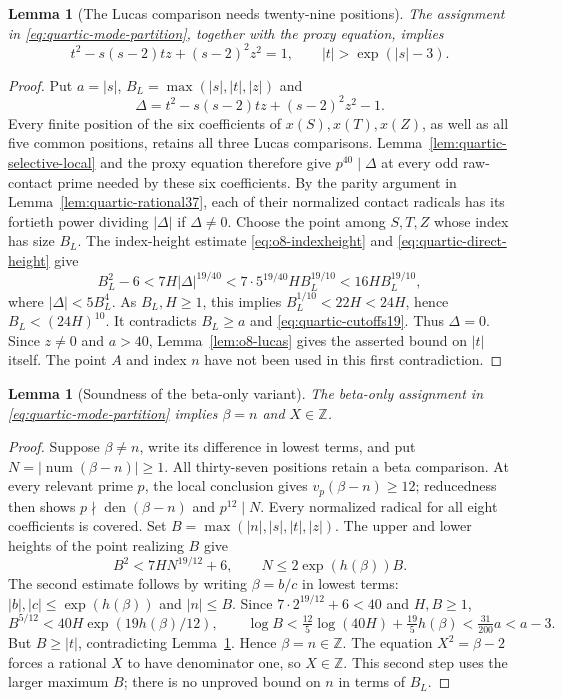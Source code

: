 \documentclass[11pt]{article}
\newtheorem{lemma}[theorem]{Lemma}
\theoremstyle{definition}
\theoremstyle{remark}
\newcommand{\Z}{\mathbb Z}
\begin{document}
\begin{lemma}[The Lucas comparison needs twenty-nine positions]
\label{lem:quartic-selective-lucas-growth}
The assignment in \eqref{eq:quartic-mode-partition}, together with
the proxy equation, implies
\[
 t^2-s(s-2)tz+(s-2)^2z^2=1,
 \qquad |t|>\exp(|s|-3).
\]
\end{lemma}
\begin{proof}
Put $a=|s|$, $B_L=\max(|s|,|t|,|z|)$ and
\[
 \Delta=t^2-s(s-2)tz+(s-2)^2z^2-1.
\]
Every finite position of the six coefficients of $x(S),x(T),x(Z)$,
as well as all five common positions, retains all three Lucas
comparisons. Lemma~\ref{lem:quartic-selective-local}
and the proxy equation therefore give $p^{40}\mid\Delta$ at every
odd raw-contact prime needed by these six coefficients. By the parity
argument in Lemma~\ref{lem:quartic-rational37}, each of their normalized
contact radicals has its fortieth power dividing $|\Delta|$ if
$\Delta\ne0$. Choose the point among $S,T,Z$ whose index has size $B_L$.
The index-height estimate \eqref{eq:o8-indexheight} and
\eqref{eq:quartic-direct-height} give
\[
 B_L^2-6<7H|\Delta|^{19/40}
       <7\cdot5^{19/40}HB_L^{19/10}<16HB_L^{19/10},
\]
where $|\Delta|<5B_L^4$. As $B_L,H\ge1$, this implies
$B_L^{1/10}<22H<24H$, hence $B_L<(24H)^{10}$.
It contradicts $B_L\ge a$ and \eqref{eq:quartic-cutoffs19}.
Thus $\Delta=0$. Since $z\ne0$ and $a>40$, Lemma~\ref{lem:o8-lucas}
gives the asserted bound on $|t|$ itself. The point $A$ and index $n$
have not been used in this first contradiction.
\end{proof}

\begin{lemma}[Soundness of the beta-only variant]
\label{lem:quartic-beta-only}
The beta-only assignment in \eqref{eq:quartic-mode-partition} implies
$\beta=n$ and $X\in\Z$.
\end{lemma}
\begin{proof}
Suppose $\beta\ne n$, write its difference in lowest terms, and put
$N=|\operatorname{num}(\beta-n)|\ge1$.
All thirty-seven positions retain a beta comparison. At every relevant
prime $p$, the local conclusion gives $v_p(\beta-n)\ge12$; reducedness
then shows $p\nmid\operatorname{den}(\beta-n)$ and $p^{12}\mid N$.
Every normalized radical for all eight coefficients is covered.
Set $B=\max(|n|,|s|,|t|,|z|)$. The upper and lower heights of the point
realizing $B$ give
\[
 B^2<7HN^{19/12}+6,
 \qquad N\le2\exp(h(\beta))B.
\]
The second estimate follows by writing $\beta=b/c$ in lowest terms:
$|b|,|c|\le\exp(h(\beta))$ and $|n|\le B$.
Since $7\cdot2^{19/12}+6<40$ and $H,B\ge1$,
\[
 B^{5/12}<40H\exp(19h(\beta)/12),
 \qquad
 \log B<\tfrac{12}{5}\log(40H)+\tfrac{19}{5}h(\beta)
         <\tfrac{31}{200}a<a-3.
\]
But $B\ge|t|$, contradicting
Lemma~\ref{lem:quartic-selective-lucas-growth}. Hence $\beta=n\in\Z$.
The equation $X^2=\beta-2$ forces a rational $X$ to have denominator
one, so $X\in\Z$. This second step uses the larger maximum $B$;
there is no unproved bound on $n$ in terms of $B_L$.
\end{proof}
\end{document}
